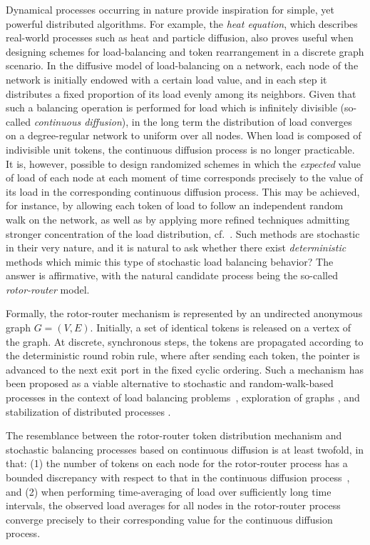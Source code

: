\documentclass{article}[11pt,letter]
\begin{document}
Dynamical processes occurring in nature provide inspiration for simple, yet powerful distributed algorithms. For example, the \emph{heat equation}, which describes real-world processes such as heat and particle diffusion, also proves useful when designing schemes for load-balancing and token rearrangement in a discrete graph scenario. In the diffusive model of load-balancing on a network, each node of the network is initially endowed with a certain load value, and in each step it distributes a fixed proportion of its load evenly among its neighbors. Given that such a balancing operation is performed for load which is infinitely divisible (so-called \emph{continuous diffusion}), in the long term the distribution of load converges on a degree-regular network to uniform over all nodes. When load is composed of indivisible unit tokens, the continuous diffusion process is no longer practicable. It is, however, possible to design randomized schemes in which the \emph{expected} value of load of each node at each moment of time corresponds precisely to the value of its load in the corresponding continuous diffusion process. This may be achieved, for instance, by allowing each token of load to follow an independent random walk on the network, as well as by applying more refined techniques admitting stronger concentration of the load distribution, cf.~\cite{DBLP:conf/focs/SauerwaldS12}. Such methods are stochastic in their very nature, and it is natural to ask whether there exist \emph{deterministic} methods which mimic this type of stochastic load balancing behavior? The answer is affirmative, with the natural candidate process being the so-called \emph{rotor-router} model.

Formally, the rotor-router mechanism is represented by an undirected anonymous graph $G = (V,E)$. Initially, a set of identical tokens is released on a vertex of the graph. At discrete, synchronous steps, the tokens are propagated according to the deterministic round robin rule, where after sending each token, the pointer is advanced to the next exit port in the fixed cyclic ordering. Such a mechanism has been proposed as a viable alternative to stochastic and random-walk-based processes in the context of load balancing problems~\cite{BerenbrinkKKMU14,DBLP:journals/cpc/CooperS06,DBLP:journals/cpc/DoerrF09}, exploration of graphs \cite{DBLP:journals/siamcomp/AfekG94,DereniowskiKPU14,Frae70,GR,KosowskiP14}, and stabilization of distributed processes \cite{BHKKR09,BhattEGT02,PhysRevLett.77.5079,YanovskiWB03}.

The resemblance between the rotor-router token distribution mechanism and stochastic balancing processes based on continuous diffusion is at least twofold, in that: (1) the number of tokens on each node for the rotor-router process has a bounded discrepancy with respect to that in the continuous diffusion process~\cite{DBLP:journals/corr/BerenbrinkKKMU14,DBLP:conf/cocoon/ShiragaYKY14}, and (2) when performing time-averaging of load over sufficiently long time intervals, the observed load averages for all nodes in the rotor-router process converge precisely to their corresponding value for the continuous diffusion process.
\end{document}
